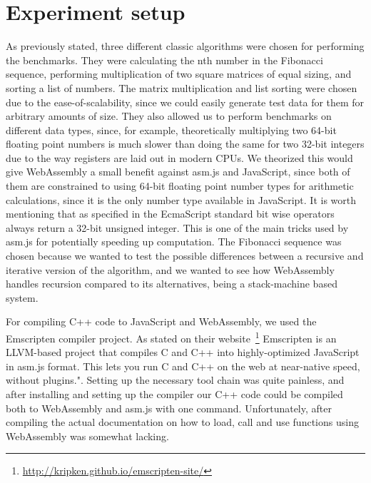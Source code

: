 \documentclass[conference]{IEEEtran}
\begin{document}
\section{Experiment setup}

As previously stated, three different classic algorithms were chosen for
performing the benchmarks. They were calculating the nth number in the
Fibonacci sequence, performing multiplication of two square matrices of equal
sizing, and sorting a list of numbers. The matrix multiplication and list
sorting were chosen due to the ease-of-scalability, since we could easily
generate test data for them for arbitrary amounts of size. They also allowed us
to perform benchmarks on different data types, since, for example,
theoretically multiplying two 64-bit floating point numbers is much slower than
doing the same for two 32-bit integers due to the way registers are laid out in
modern CPUs. We theorized this would give WebAssembly a small benefit against
asm.js and JavaScript, since both of them are constrained to using 64-bit
floating point number types for arithmetic calculations, since it is the only
number type available in JavaScript. It is worth mentioning that as specified
in the EcmaScript standard\cite{EcmaScript} bit wise operators always return a
32-bit unsigned integer. This is one of the main tricks used by asm.js for
potentially speeding up computation. The Fibonacci sequence was chosen
because we wanted to test the possible differences between a recursive and
iterative version of the algorithm, and we wanted to see how WebAssembly
handles recursion compared to its alternatives, being a stack-machine based
system.

For compiling C++ code to JavaScript and WebAssembly, we used the Emscripten
compiler project. As stated on their
website~\footnote{\url{http://kripken.github.io/emscripten-site/}} Emscripten
is an LLVM-based project that compiles C and C++ into highly-optimized
JavaScript in asm.js format. This lets you run C and C++ on the web at
near-native speed, without plugins.". Setting up the necessary tool chain was
quite painless, and after installing and setting up the compiler our C++ code
could be compiled both to WebAssembly and asm.js with one command.
Unfortunately, after compiling the actual documentation on how to load, call
and use functions using WebAssembly was somewhat lacking.
\end{document}
